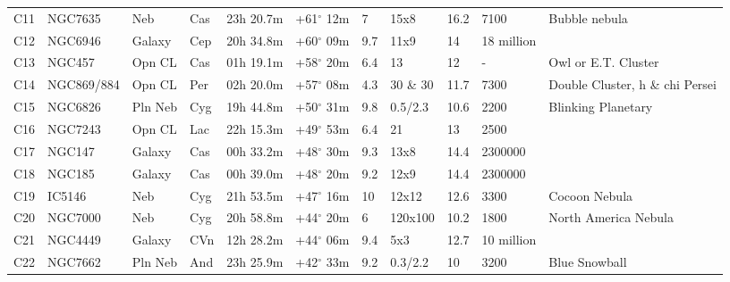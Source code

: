 \begin{longtable}{@{}lllllllllll@{}}
C11        & NGC7635     & Neb        & Cas       & 23h 20.7m & +61$^{\circ}$ 12m  & 7         & 15x8                 & 16.2     & 7100                & Bubble nebula                   \\
C12        & NGC6946     & Galaxy     & Cep       & 20h 34.8m & +60$^{\circ}$ 09m  & 9.7       & 11x9                 & 14       & 18 million          &                                 \\
C13        & NGC457      & Opn CL     & Cas       & 01h 19.1m & +58$^{\circ}$ 20m  & 6.4       & 13                   & 12       & -                   & Owl or E.T. Cluster             \\
C14        & NGC869/884  & Opn CL     & Per       & 02h 20.0m & +57$^{\circ}$ 08m  & 4.3       & 30 \& 30             & 11.7     & 7300                & Double Cluster, h \& chi Persei \\
C15        & NGC6826     & Pln Neb    & Cyg       & 19h 44.8m & +50$^{\circ}$ 31m  & 9.8       & 0.5/2.3              & 10.6     & 2200                & Blinking Planetary              \\
C16        & NGC7243     & Opn CL     & Lac       & 22h 15.3m & +49$^{\circ}$ 53m  & 6.4       & 21                   & 13       & 2500                &                                 \\
C17        & NGC147      & Galaxy     & Cas       & 00h 33.2m & +48$^{\circ}$ 30m  & 9.3       & 13x8                 & 14.4     & 2300000             &                                 \\
C18        & NGC185      & Galaxy     & Cas       & 00h 39.0m & +48$^{\circ}$ 20m  & 9.2       & 12x9                 & 14.4     & 2300000             &                                 \\
C19        & IC5146      & Neb        & Cyg       & 21h 53.5m & +47$^{\circ}$ 16m  & 10        & 12x12                & 12.6     & 3300                & Cocoon Nebula                   \\
C20        & NGC7000     & Neb        & Cyg       & 20h 58.8m & +44$^{\circ}$ 20m  & 6         & 120x100              & 10.2     & 1800                & North America Nebula            \\
C21        & NGC4449     & Galaxy     & CVn       & 12h 28.2m & +44$^{\circ}$ 06m  & 9.4       & 5x3                  & 12.7     & 10 million          &                                 \\
C22        & NGC7662     & Pln Neb    & And       & 23h 25.9m & +42$^{\circ}$ 33m  & 9.2       & 0.3/2.2              & 10       & 3200                & Blue Snowball                   \\

\end{longtable}
